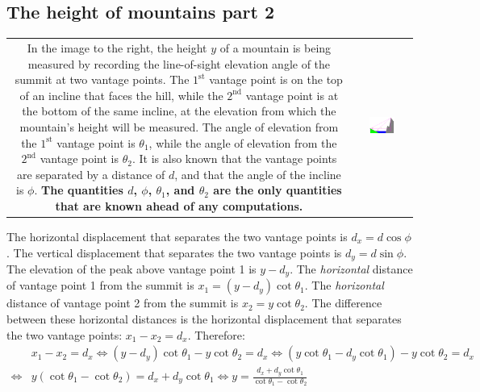 \documentclass{article}
\begin{document}
\subsection*{The height of mountains part 2}

\begin{tabular}{cc}
\parbox{0.5\textwidth}{
In the image to the right, the height \(y\) of a mountain is being measured by recording the line-of-sight elevation angle of the summit at two vantage points. The \(1^\text{st}\) vantage point is on the top of an incline that faces the hill, while the \(2^\text{nd}\) vantage point is at the bottom of the same incline, at the elevation from which the mountain's height will be measured. The angle of elevation from the \(1^\text{st}\) vantage point is \(\theta_1\), while the angle of elevation from the \(2^\text{nd}\) vantage point is \(\theta_2\). It is also known that the vantage points are separated by a distance of \(d\), and that the angle of the incline is \(\phi\). {\bf The quantities \(d\), \(\phi\), \(\theta_1\), and \(\theta_2\) are the only quantities that are known ahead of any computations.}
} & \parbox{0.5\textwidth}{
\includegraphics[width = 0.5\textwidth]{mountain_height_2}
}
\end{tabular}

The horizontal displacement that separates the two vantage points is \(d_x = d\cos\phi\). The vertical displacement that separates the two vantage points is \(d_y = d\sin\phi\). The elevation of the peak above vantage point 1 is \(y - d_y\). The \emph{horizontal} distance of vantage point 1 from the summit is \(x_1 = (y - d_y)\cot\theta_1\). The \emph{horizontal} distance of vantage point 2 from the summit is \(x_2 = y\cot\theta_2\). The difference between these horizontal distances is the horizontal displacement that separates the two vantage points: \(x_1 - x_2 = d_x\). Therefore:
\begin{align*}
& x_1 - x_2 = d_x 
\iff (y - d_y)\cot\theta_1 - y\cot\theta_2 = d_x 
\iff (y\cot\theta_1 - d_y\cot\theta_1) - y\cot\theta_2 = d_x \\
\iff & y(\cot\theta_1 - \cot\theta_2) = d_x + d_y\cot\theta_1 
\iff y = \frac{d_x + d_y\cot\theta_1}{\cot\theta_1 - \cot\theta_2}
\end{align*}
\end{document}
